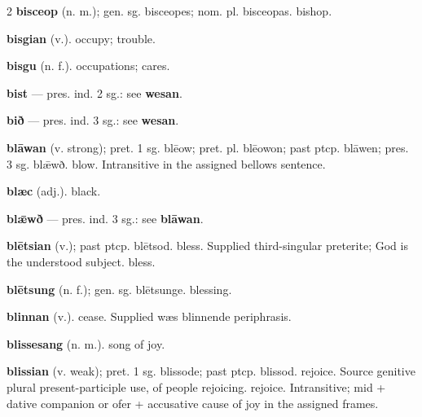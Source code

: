 \begin{multicols*}{2}
\textbf{bisceop} (n. m.); gen. sg. bisceopes; nom. pl. bisceopas. bishop.\par
\textbf{bisgian} (v.). occupy; trouble.\par
\textbf{bisgu} (n. f.). occupations; cares.\par
\textbf{bist} — pres. ind. 2 sg.: see \textbf{wesan}.\par
\textbf{bið} — pres. ind. 3 sg.: see \textbf{wesan}.\par
\textbf{blāwan} (v. strong); pret. 1 sg. blēow; pret. pl. blēowon; past ptcp. blāwen; pres. 3 sg. blǣwð. blow. Intransitive in the assigned bellows sentence.\par
\textbf{blæc} (adj.). black.\par
\textbf{blǣwð} — pres. ind. 3 sg.: see \textbf{blāwan}.\par
\textbf{blētsian} (v.); past ptcp. blētsod. bless. Supplied third-singular preterite; God is the understood subject. bless.\par
\textbf{blētsung} (n. f.); gen. sg. blētsunge. blessing.\par
\textbf{blinnan} (v.). cease. Supplied wæs blinnende periphrasis.\par
\textbf{blissesang} (n. m.). song of joy.\par
\textbf{blissian} (v. weak); pret. 1 sg. blissode; past ptcp. blissod. rejoice. Source genitive plural present-participle use, of people rejoicing. rejoice. Intransitive; mid + dative companion or ofer + accusative cause of joy in the assigned frames.\par

\end{multicols*}

